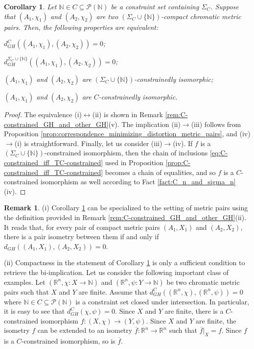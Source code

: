 \documentclass[8pt,a4paper,oneside,english,english]{article}
\theoremstyle{plain}
\theoremstyle
{plain}
\newtheorem{corollary}[theorem]{Corollary}%
\theoremstyle{definition}
\newtheorem{remark}[theorem]{Remark}%
\newcommand{\N}{\mathbb{N}}
\newcommand{\R}{\mathbb{R}}
\newcommand{\GH}{d_{GH}}
\newcommand{\MP}[1]{(A_{#1},\chi_{#1})}
\begin{document}
\begin{corollary}\label{coro:0_distance_chromatic}
    Let $\N\in C\subseteq\mathcal P(\N)$ be a constraint set containing $\Sigma_C$. Suppose that $\MP{1}$ and $\MP{2}$ are two $(\Sigma_C\cup\{\N\})$-compact chromatic metric pairs. Then, the following properties are equivalent:
    \begin{compactenum}[(i)]
        \item $\GH^C(\MP{1},\MP{2})=0$;
        \item $\GH^{\Sigma_C\cup\{\N\}}(\MP{1},\MP{2})=0$;
        \item $\MP{1}$ and $\MP{2}$ are $(\Sigma_C\cup\{\N\})$-constrainedly isomorphic;
        \item $\MP{1}$ and $\MP{2}$ are $C$-constrainedly isomorphic.
    \end{compactenum}
\end{corollary}
\begin{proof}
    The equivalence (i)$\leftrightarrow$(ii) is shown in Remark \ref{rem:C-constrained_GH_and_other_GH}(v). The implication (ii)$\to$(iii) follows from Proposition \ref{prop:correspondence_minimizing_distortion_metric_pairs}, and (iv)$\to$(i) is straightforward. Finally, let us consider (iii)$\to$(iv). If $f$ is a $(\Sigma_C\cup\{\N\})$-constrained isomorphism, then the chain of inclusions \eqref{eq:C-constrained_iff_TC-constrained} used in Proposition \ref{prop:C-constrained_iff_TC-constrained} becomes a chain of equalities, and so $f$ is a $C$-constrained isomorphism as well according to Fact \ref{fact:C_n_and_sigma_n}(iv). 
\end{proof}



\begin{remark}\label{rem:isometry_of_finite_point_clouds}
    (i) Corollary \ref{coro:0_distance_chromatic} can be specialized to the setting of metric pairs using the definition provided in Remark \ref{rem:C-constrained_GH_and_other_GH}(ii). It reads that, for every pair of compact metric pairs $(A_1,X_1)$ and $(A_2,X_2)$, there is a pair isometry between them if and only if $\GH((A_1,X_1),(A_2,X_2))=0$.
    
    (ii) Compactness in the statement of Corollary \ref{coro:0_distance_chromatic} is only a sufficient condition to retrieve the bi-implication. Let us consider the following important class of examples. Let $(\R^n,\chi\colon X\to\N)$ and $(\R^n,\psi\colon Y\to\N)$ be two chromatic metric pairs such that $X$ and $Y$ are finite. Assume that $\GH^C((\R^n,\chi),(\R^n,\psi))=0$ where $\N\in C\subseteq\mathcal P(\N)$ is a constraint set closed under intersection. In particular, it is easy to see that $\GH^C(\chi,\psi)=0$. Since $X$ and $Y$ are finite, there is a $C$-constrained isomorphism $f\colon (X,\chi)\to (Y,\psi)$. Since $X$ and $Y$ are finite, the isometry $f$ can be extended to an isometry $\overline f\colon\R^n\to\R^n$ such that $\overline f|_X=f$. Since $f$ is a $C$-constrained isomorphism, so is $\overline f$.


\end{remark}
\end{document}
